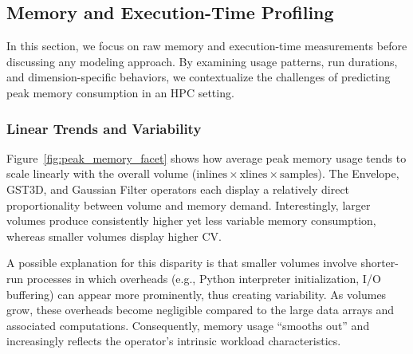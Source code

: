 \subsection{Memory and Execution-Time Profiling}
\label{subsec:pmc-results-memory-and-execution-time-profiling}

In this section, we focus on raw memory and execution-time measurements before discussing any modeling approach.
By examining usage patterns, run durations, and dimension-specific behaviors, we contextualize the challenges of predicting peak memory consumption in an \ac{HPC} setting.

\subsubsection{Linear Trends and Variability}
\label{subsec:linear-trends-and-variability}

Figure~\ref{fig:peak_memory_facet} shows how average peak memory usage tends to scale linearly with the overall volume (\(\text{inlines} \times \text{xlines} \times \text{samples}\)).
The Envelope, \ac{GST3D}, and Gaussian Filter operators each display a relatively direct proportionality between volume and memory demand.
Interestingly, larger volumes produce consistently higher yet less variable memory consumption, whereas smaller volumes display higher \ac{CV}.

A possible explanation for this disparity is that smaller volumes involve shorter-run processes in which overheads (e.g., Python interpreter initialization, I/O buffering) can appear more prominently, thus creating variability.
As volumes grow, these overheads become negligible compared to the large data arrays and associated computations.
Consequently, memory usage “smooths out” and increasingly reflects the operator’s intrinsic workload characteristics.

